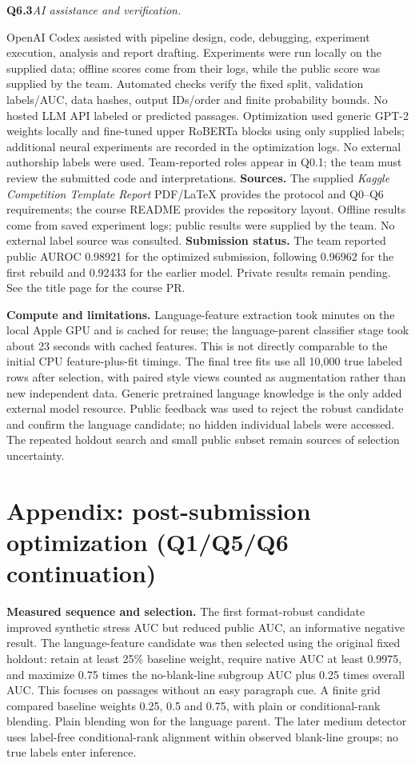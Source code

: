 \documentclass[10pt,letterpaper]{article}
\newcommand{\q}[2]{\needspace{4\baselineskip}\par\addvspace{7pt}\textbf{#1}\quad\textit{#2}\par\nobreak}
\begin{document}
\q{Q6.3}{AI assistance and verification.}
OpenAI Codex assisted with pipeline design, code, debugging, experiment execution, analysis and report drafting.
Experiments were run locally on the supplied data; offline scores come from their logs, while the public score was supplied by the team.
Automated checks verify the fixed split, validation labels/AUC, data hashes, output IDs/order and finite probability bounds.
No hosted LLM API labeled or predicted passages. Optimization used generic GPT-2 weights locally and fine-tuned upper RoBERTa blocks using only supplied labels; additional neural experiments are recorded in the optimization logs. No external authorship labels were used.
Team-reported roles appear in Q0.1; the team must review the submitted code and interpretations.
\vspace{.1in}
\textbf{Sources.} The supplied \emph{Kaggle Competition Template Report} PDF/LaTeX provides the protocol and Q0--Q6 requirements; the course README provides the repository layout. Offline results come from saved experiment logs; public results were supplied by the team. No external label source was consulted.
\vspace{.1in}
\textbf{Submission status.}
The team reported public AUROC 0.98921 for the optimized submission, following 0.96962 for the first rebuild and 0.92433 for the earlier model. Private results remain pending. See the title page for the course PR.

\textbf{Compute and limitations.} Language-feature extraction took minutes on the local Apple GPU and is cached for reuse; the language-parent classifier stage took about 23 seconds with cached features. This is not directly comparable to the initial CPU feature-plus-fit timings. The final tree fits use all 10,000 true labeled rows after selection, with paired style views counted as augmentation rather than new independent data. Generic pretrained language knowledge is the only added external model resource. Public feedback was used to reject the robust candidate and confirm the language candidate; no hidden individual labels were accessed. The repeated holdout search and small public subset remain sources of selection uncertainty.

\newpage
\section*{Appendix: post-submission optimization (Q1/Q5/Q6 continuation)}
\textbf{Measured sequence and selection.} The first format-robust candidate improved synthetic stress AUC but reduced public AUC, an informative negative result. The language-feature candidate was then selected using the original fixed holdout: retain at least 25\% baseline weight, require native AUC at least 0.9975, and maximize 0.75 times the no-blank-line subgroup AUC plus 0.25 times overall AUC. This focuses on passages without an easy paragraph cue. A finite grid compared baseline weights 0.25, 0.5 and 0.75, with plain or conditional-rank blending. Plain blending won for the language parent. The later medium detector uses label-free conditional-rank alignment within observed blank-line groups; no true labels enter inference.
\end{document}
